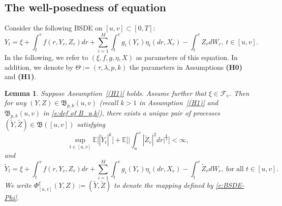 \documentclass[11pt,reqno]{amsart}
\newtheorem{lemma}{Lemma}[section]
\numberwithin{equation}{section}
\begin{document}
\subsection{The well-posedness of equation}\label{sec:picard}

Consider the following BSDE on $[u,v]\subset[0,T]$:
\begin{equation}\label{e:BSDE-Phi'}
Y_{t} =\xi+ \int_{t}^{v}f(r,Y_{r},Z_{r}) dr + \sum_{i=1}^{M}\int_{t}^{v} g_{i}(Y_{r})\eta_{i}(dr,X_{r}) - \int_{t}^{v}Z_{r}dW_{r}, ~ t\in  [u,v].
\end{equation}
In the following, we refer to $(\xi,f,g,\eta,X)$ as parameters of this equation. In addition, we denote by $\Theta:=(\tau,\lambda,p,k)$  the parameters in Assumptions {\bf(H0)} and {\bf(H1)}.

\begin{lemma}\label{lem:BSDE-Phi}
Suppose Assumption~\ref{(H1)} holds. Assume further that $\xi \in\mathcal{F}_{v}$. Then for any $(Y,Z)\in \mathfrak B_{p,k}(u,v)$ (recall $k>1$ in Assumption~\ref{(H1)} and $\mathfrak{B}_{p,k}(u,v)$ in \eqref{e:def of B_p,k}), there exists a unique pair of processes $(\tilde{Y}, \tilde{Z})\in\mathfrak{B}([u,v])$ satisfying \[\sup_{t\in[u,v]}\mathbb{E}\Big[\left|\tilde{Y}_{t}\right|^{k}\Big]+\mathbb{E}\Big[\Big|\int_{u}^{v}|\tilde{Z}_{r}|^{2}dr\Big|^{\frac{k}{2}}\Big]<\infty,\] 
and
\begin{equation}\label{e:BSDE-Phi}
\tilde{Y}_{t} =\xi+ \int_{t}^{v}f(r,Y_{r},Z_{r}) dr + \sum_{i=1}^{M}\int_{t}^{v} g_{i}(Y_{r})\eta_{i}(dr,X_{r}) - \int_{t}^{v}\tilde{Z}_{r}dW_{r}, ~ \text{for all } t\in  [u,v].
\end{equation}
We write $\Phi^{\xi}_{[u,v]}(Y,Z):=(\tilde{Y},\tilde{Z})$ to denote the mapping defined by \eqref{e:BSDE-Phi}. 
\end{lemma}
\end{document}
